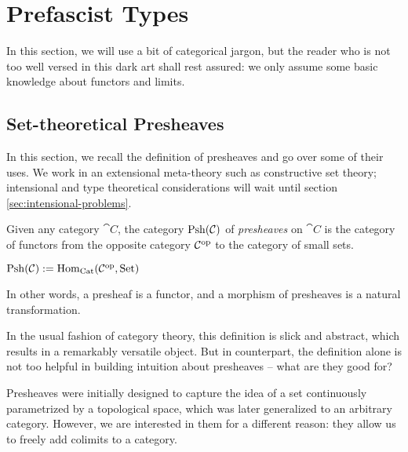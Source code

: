 \setchapterpreamble[u]{\margintoc}
\chapter{Prefascist Types}


In this section, we will use a bit of categorical jargon, but the reader
who is not too well versed in this dark art shall rest assured:
we only assume some basic knowledge about functors and limits.

\section{Set-theoretical Presheaves}\label{sec:categorical-reminders}

In this section, we recall the definition of presheaves and go over 
some of their uses. 
% 
We work in an extensional meta-theory such as constructive set theory;
intensional and type theoretical considerations will wait until section 
\ref{sec:intensional-problems}.

Given any category \( \cat{C} \), the category 
\( \catPsh{\cat{C}} \) of \emph{presheaves} on \( \cat{C} \) is the category 
of functors from the opposite category \( \op{\cat{C}} \) to the category of 
small sets.
\begin{definition}
\(
    \catPsh{\cat{C}} := \hom[\catCat]{\op{\cat{C}}}{\catSet}
\)
\end{definition}
In other words, a presheaf is a functor, and a morphism of presheaves
is a natural transformation.

In the usual fashion of category theory, this definition is slick
and abstract, which results in a remarkably versatile object. 
% 
But in counterpart, the definition alone is not too helpful in building
intuition about presheaves -- what are they good for?

Presheaves were initially designed to capture 
the idea of a set continuously parametrized by a topological space, which
was later generalized to an arbitrary category. 
% 
However, we are interested in them for a different reason: they allow us
to freely add colimits to a category.

